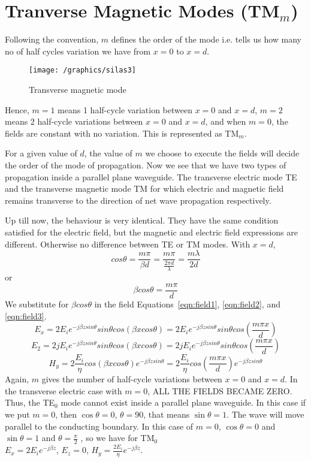 \section{Tranverse Magnetic  Modes (TM$_m$)}
 Following the convention, $m$ defines the order of the mode i.e. tells us how many no of half cycles variation we have from $x = 0$ to $x = d$.
\begin{figure}[h]
\centering
\texttt{[image: /graphics/silas3]}
\caption{Transverse magnetic  mode}
\end{figure}
Hence, $ m = 1$ means 1 half-cycle variation between $x = 0$ and $x = d$, $m = 2$ means 2 half-cycle variations between $x = 0$ and $x = d$, and when $m = 0$, the fields are constant with no variation. This is represented as TM$_m$. 

For a given value of $d$, the value of $m$ we choose to execute the fields will decide the order of the mode of propagation. Now we see that we have two types of propagation inside a parallel plane waveguide. The transverse electric mode TE and the transverse magnetic mode TM for which electric and magnetic field remains transverse to the direction of net wave propagation respectively. 

Up till now, the behaviour is very identical. They have the same condition satisfied for the electric field, but the magnetic and electric field expressions are different. Otherwise no difference between TE or TM modes. With $x = d$,
\begin{dmath*}
cos\theta = \frac{m \pi}{\beta d} =\frac{m \pi}{\frac{2\pi d}{\lambda}} = \frac{m\lambda}{2d}
\end{dmath*} 
or
\begin{dmath*}
\beta cos\theta = \frac{m \pi}{d}
\end{dmath*}
We substitute for $\beta cos\theta$ in the field Equations~\ref{eqn:field1}, \ref{eqn:field2}, and \ref{eqn:field3}.
\begin{dmath}
E_{x} = 2 E_{i} e^{-j\beta zsin\theta} sin\theta cos(\beta xcos\theta) = 2 E_{i} e^{-j\beta zsin\theta} sin\theta cos(\frac{m\pi x}{d})
\end{dmath}
\begin{dmath}
E_{2} = 2 jE_{i} e^{-j\beta zsin\theta} sin\theta cos(\beta xcos\theta) = 2 jE_{i} e^{-j\beta zsin\theta} sin\theta cos(\frac{m\pi x}{d})
\end{dmath}
\begin{dmath}
H_{y} = 2 \frac{E_{i}}{\eta} cos(\beta xcos\theta) e^{-j\beta zsin\theta} =2 \frac{E_{i}}{\eta} cos(\frac{m\pi x}{d}) e^{-j\beta zsin\theta} 
\end{dmath}
Again, $m$ gives the number of half-cycle variations between $x = 0$ and $x = d$. In the transverse electric case with $m = 0$, ALL THE FIELDS BECAME ZERO. Thus, the TE$_0$ mode cannot exist inside a parallel plane waveguide. In this case if we put $m = 0$, then $\cos\theta =0$, $\theta =90$, that means $\sin\theta =1$. The wave will move parallel to the conducting boundary. In this case of $m = 0$, $\cos\theta =0$ and $\sin\theta =1$ and $\theta=\frac{\pi}{2}$ , so we have for TM$_0$\\ 
$E_{x} =2E_{i} e^{-j\beta z}$, $E_{z}= 0$, $H_{y} =\frac{2E_{i}}{\eta} e^{-j\beta z}$.

